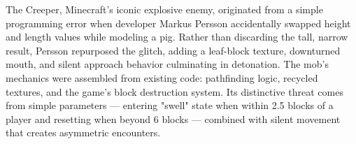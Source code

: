 The Creeper, Minecraft's iconic explosive enemy, originated from a simple programming error when developer Markus Persson accidentally swapped height and length values while modeling a pig. Rather than discarding the tall, narrow result, Persson repurposed the glitch, adding a leaf-block texture, downturned mouth, and silent approach behavior culminating in detonation. The mob's mechanics were assembled from existing code: pathfinding logic, recycled textures, and the game's block destruction system. Its distinctive threat comes from simple parameters — entering "swell" state when within 2.5 blocks of a player and resetting when beyond 6 blocks — combined with silent movement that creates asymmetric encounters.
